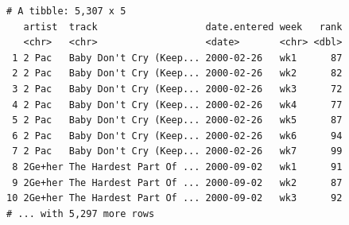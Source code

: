 \documentclass[
  11pt,
]{krantz}
\newenvironment{Shaded}{\begin{snugshade}}{\end{snugshade}}
\newcommand{\CommentTok}[1]{\textcolor[rgb]{0.37,0.37,0.37}{\textit{#1}}}
\newcommand{\DataTypeTok}[1]{\textcolor[rgb]{0.27,0.27,0.27}{#1}}
\newcommand{\KeywordTok}[1]{\textcolor[rgb]{0.27,0.27,0.27}{\textbf{#1}}}
\newcommand{\NormalTok}[1]{#1}
\newcommand{\OperatorTok}[1]{\textcolor[rgb]{0.43,0.43,0.43}{\textbf{#1}}}
\newcommand{\OtherTok}[1]{\textcolor[rgb]{0.37,0.37,0.37}{#1}}
\newcommand{\StringTok}[1]{\textcolor[rgb]{0.5,0.5,0.5}{#1}}
\begin{document}
\begin{Shaded}
\end{Shaded}

\begin{verbatim}
# A tibble: 5,307 x 5
   artist  track                   date.entered week   rank
   <chr>   <chr>                   <date>       <chr> <dbl>
 1 2 Pac   Baby Don't Cry (Keep... 2000-02-26   wk1      87
 2 2 Pac   Baby Don't Cry (Keep... 2000-02-26   wk2      82
 3 2 Pac   Baby Don't Cry (Keep... 2000-02-26   wk3      72
 4 2 Pac   Baby Don't Cry (Keep... 2000-02-26   wk4      77
 5 2 Pac   Baby Don't Cry (Keep... 2000-02-26   wk5      87
 6 2 Pac   Baby Don't Cry (Keep... 2000-02-26   wk6      94
 7 2 Pac   Baby Don't Cry (Keep... 2000-02-26   wk7      99
 8 2Ge+her The Hardest Part Of ... 2000-09-02   wk1      91
 9 2Ge+her The Hardest Part Of ... 2000-09-02   wk2      87
10 2Ge+her The Hardest Part Of ... 2000-09-02   wk3      92
# ... with 5,297 more rows
\end{verbatim}

\begin{Shaded}
\end{Shaded}
\end{document}

